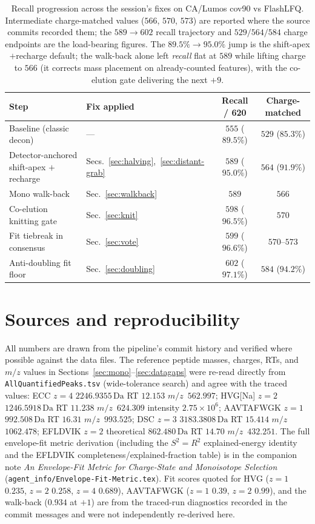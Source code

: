 \documentclass[11pt]{article}
\newcommand{\Da}{\,\text{Da}}
\newcommand{\mz}{\ensuremath{m/z}}
\newcommand{\zeq}[1]{\ensuremath{z{=}#1}}
\begin{document}
\begin{table}[h]
\centering
\renewcommand{\arraystretch}{1.25}
\begin{tabular}{@{}l l c c@{}}
\toprule
\textbf{Step} & \textbf{Fix applied} & \textbf{Recall / 620} & \textbf{Charge-matched} \\
\midrule
Baseline (classic decon) & --- & $555$ ($89.5\%$) & $529$ ($85.3\%$) \\
Detector-anchored shift-apex $+$ recharge & Secs.~\ref{sec:halving},~\ref{sec:distant-grab} & $589$ ($95.0\%$) & $564$ ($91.9\%$) \\
Mono walk-back & Sec.~\ref{sec:walkback} & $589$ & $566$ \\
Co-elution knitting gate & Sec.~\ref{sec:knit} & $598$ ($96.5\%$) & $570$ \\
Fit tiebreak in consensus & Sec.~\ref{sec:vote} & $599$ ($96.6\%$) & $570$--$573$ \\
Anti-doubling fit floor & Sec.~\ref{sec:doubling} & $602$ ($97.1\%$) & $584$ ($94.2\%$) \\
\bottomrule
\end{tabular}
\caption{Recall progression across the session's fixes on CA/Lumos cov90 vs FlashLFQ. Intermediate
charge-matched values ($566$, $570$, $573$) are reported where the source commits recorded them; the
$589 \rightarrow 602$ recall trajectory and $529/564/584$ charge endpoints are the load-bearing
figures. The $89.5\% \rightarrow 95.0\%$ jump is the shift-apex$+$recharge default; the walk-back
alone left \emph{recall} flat at $589$ while lifting charge to $566$ (it corrects mass placement on
already-counted features), with the co-elution gate delivering the next $+9$.}
\label{tab:progression}
\end{table}

\section*{Sources and reproducibility}
All numbers are drawn from the pipeline's commit history and verified where possible against the
data files. The reference peptide masses, charges, RTs, and \mz{} values in
Sections~\ref{sec:mono}--\ref{sec:datagaps} were re-read directly from
\texttt{AllQuantifiedPeaks.tsv} (wide-tolerance search) and agree with the traced values: ECC \zeq{4}
$2246.9355\Da$ RT $12.153$ \mz\ $562.997$; HVG[Na] \zeq{2} $1246.5918\Da$ RT $11.238$ \mz\ $624.309$
intensity $2.75\times10^{6}$; AAVTAFWGK \zeq{1} $992.508\Da$ RT $16.31$ \mz\ $993.525$; DSC \zeq{3}
$3183.3808\Da$ RT $15.414$ \mz\ $1062.478$; EFLDVIK \zeq{2} theoretical $862.480\Da$ RT $14.70$ \mz\
$432.251$. The full envelope-fit metric derivation (including the $S^2 = R^2$ explained-energy
identity and the EFLDVIK completeness/explained-fraction table) is in the companion note
\emph{An Envelope-Fit Metric for Charge-State and Monoisotope Selection}
(\texttt{agent\_info/Envelope-Fit-Metric.tex}). Fit scores quoted for HVG (\zeq{1} $0.235$, \zeq{2}
$0.258$, \zeq{4} $0.689$), AAVTAFWGK (\zeq{1} $0.39$, \zeq{2} $0.99$), and the walk-back ($0.934$ at
$+1$) are from the traced-run diagnostics recorded in the commit messages and were not independently
re-derived here.
\end{document}
